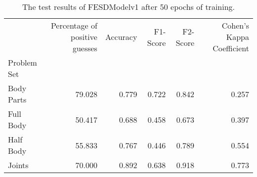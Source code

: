 \begin{table}
      \caption[]{}
      \label{}
          \begin{table}[!htbp]
        \caption[Test Results of FESDModelv1]{The test results of FESDModelv1 after 50 epochs of training.}
        \label{tab:res_v1}
        \begin{tabular}{lrrrrr}
\hline
{} &  Percentage of positive guesses &  Accuracy &  F1-Score &  F2-Score &  Cohen's Kappa Coefficient \\
Problem Set   &                                 &           &           &           &                            \\
\hline
Body Parts &                          79.028 &     0.779 &     0.722 &     0.842 &                      0.257 \\
Full Body  &                          50.417 &     0.688 &     0.458 &     0.673 &                      0.397 \\
Half Body  &                          55.833 &     0.767 &     0.446 &     0.789 &                      0.554 \\
Joints     &                          70.000 &     0.892 &     0.638 &     0.918 &                      0.773 \\
\hline
\end{tabular}

    \end{table}
  \end{table}